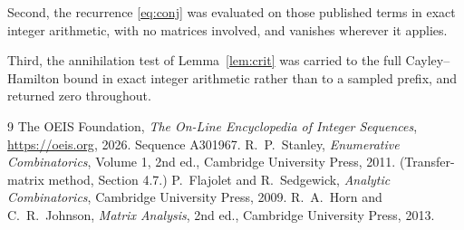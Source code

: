 \documentclass[11pt,a4paper]{article}
\theoremstyle{plain}
\theoremstyle{definition}
\begin{document}
Second, the recurrence \eqref{eq:conj} was evaluated on those published terms in exact
integer arithmetic, with no matrices involved, and vanishes wherever it applies.

Third, the annihilation test of Lemma~\ref{lem:crit} was carried to the full
Cayley--Hamilton bound in exact integer arithmetic rather than to a sampled prefix, and
returned zero throughout.

\begin{thebibliography}{9}
 The OEIS Foundation, \emph{The On-Line Encyclopedia of Integer
Sequences}, \url{https://oeis.org}, 2026. Sequence A301967.
 R.~P.~Stanley, \emph{Enumerative Combinatorics}, Volume 1, 2nd ed.,
Cambridge University Press, 2011. (Transfer-matrix method, Section 4.7.)
 P.~Flajolet and R.~Sedgewick, \emph{Analytic Combinatorics}, Cambridge
University Press, 2009.
 R.~A.~Horn and C.~R.~Johnson, \emph{Matrix Analysis}, 2nd ed., Cambridge
University Press, 2013.
\end{thebibliography}
\end{document}
